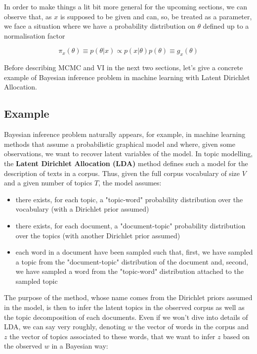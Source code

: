 In order to make things a lit bit more general for the upcoming sections, we can observe that, as $x$ is supposed to be given and can, so, be treated as a parameter, we face a situation where we have a probability distribution on $\theta$ defined up to a normalisation factor

\begin{equation}\pi_{x}(\theta) \equiv p(\theta | x) \propto p(x | \theta) p(\theta) \equiv g_{x}(\theta)\end{equation}

Before describing MCMC and VI in the next two sections, let's give a concrete example of Bayesian inference problem in machine learning with Latent Dirichlet Allocation.

\subsection{Example}

Bayesian inference problem naturally appears, for example, in machine learning methods that assume a probabilistic graphical model and where, given some observations, we want to recover latent variables of the model. In topic modelling, the \textbf{Latent Dirichlet Allocation (LDA)} method defines such a model for the description of texts in a corpus. Thus, given the full corpus vocabulary of size $V$ and a given number of topics $T$, the model assumes:

\begin{itemize}
    \item     there exists, for each topic, a "topic-word" probability distribution over the vocabulary (with a Dirichlet prior assumed)
    \item     there exists, for each document, a "document-topic" probability distribution over the topics (with another Dirichlet prior assumed)
    \item     each word in a document have been sampled such that, first, we have sampled a topic from the "document-topic" distribution of the document and, second, we have sampled a word from the "topic-word" distribution attached to the sampled topic
\end{itemize}


The purpose of the method, whose name comes from the Dirichlet priors assumed in the model, is then to infer the latent topics in the observed corpus as well as the topic decomposition of each documents. Even if we won't dive into details of LDA, we can say very roughly, denoting $w$ the vector of words in the corpus and $z$ the vector of topics associated to these words, that we want to infer $z$ based on the observed $w$ in a Bayesian way:


